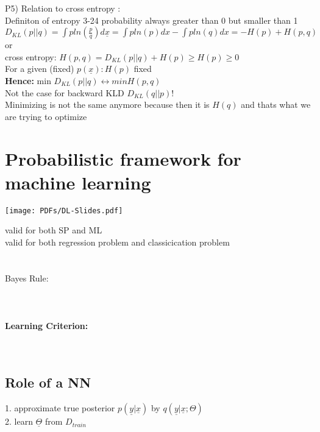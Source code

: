 P5) Relation to cross entropy : \\
Definiton of entropy 3-24
probability always greater than 0 but smaller than 1 \\
$
D _ {KL } (p || q) = \int p ln(\frac{p}{q}) d \underline{x} = \int p ln(p) dx - \int p ln(q) dx = - H(p) + H(p,q)  $ or \\
cross entropy: $ H(p,q) = D _ {KL } (p || q) + H(p) \geq H(p) \geq 0$ \\
For a given (fixed) $p(\underline{x}) : H(p)$ fixed \\
\textbf{Hence: } min $D _ {KL } (p || q) \leftrightarrow min H(p,q)$ \\
Not the case for backward KLD $D _ {KL } (q || p)$! \\
Minimizing is not the same anymore because then it is $H(q)$ and thats what we are trying to optimize
\section{Probabilistic framework for machine learning}
\texttt{[image: PDFs/DL-Slides.pdf]}

valid for both SP and ML \\
valid for both regression problem and classicication problem \\
 \\
 \\
Bayes Rule: \\
 \\
 \\
 \\
\textbf{Learning Criterion: } \\
 \\
 \\
\subsection{Role of a NN }

1. approximate true posterior $p(\underline{y} | \underline{x}) $ by $ q (\underline{y} | \underline{x} ; \Theta)$ \\
2. learn $\underline{ \Theta }$ from $D_ {train }$